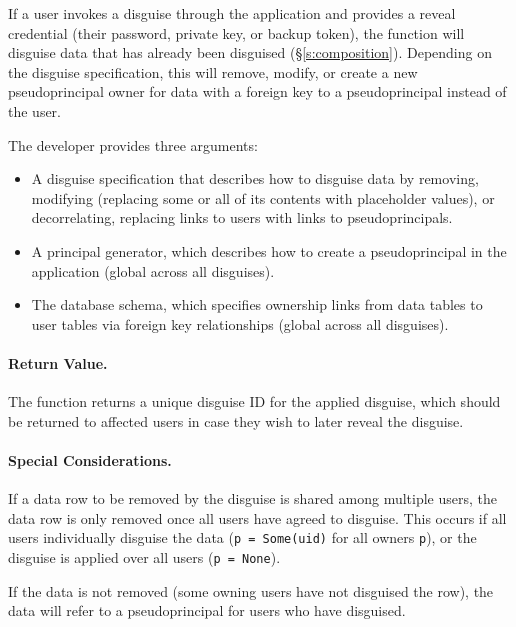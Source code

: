     If a user invokes a disguise through the application and provides a reveal
    credential (their password, private key, or backup token), the function will
    disguise data that has already been disguised (\S\ref{s:composition}).
    Depending on the disguise specification, this will remove, modify, or create
    a new pseudoprincipal owner for data with a foreign key to a pseudoprincipal
    instead of the user.

    The developer provides three arguments:
    \begin{itemize}[nosep]
    \item A disguise specification that describes how to disguise data by
    removing, modifying (replacing some or all of its contents with placeholder
    values), or decorrelating, replacing links to users with links to
    pseudoprincipals.
    
    \item A principal generator, which describes how to create a
    pseudoprincipal in the application (global across all disguises).
    
    \item The database schema, which specifies ownership links from data tables to user
    tables via foreign key relationships (global across all disguises).
    \end{itemize}

    \paragraph{Return Value.} 
    The function returns a unique disguise ID for the applied disguise, which
    should be returned to affected users in case they wish to later reveal the
    disguise.

    \paragraph{Special Considerations.}
    If a data row to be removed by the disguise is shared among multiple users,
    the data row is only removed once all users have agreed to disguise. This
    occurs if \one{} all users individually disguise the data (\texttt{p =
    Some(uid)} for all owners \texttt{p}), or \two{} the disguise is applied
    over all users (\texttt{p = None}).
   
    If the data is not removed (some owning users have not disguised the row),
    the data will refer to a pseudoprincipal for users who have disguised.


